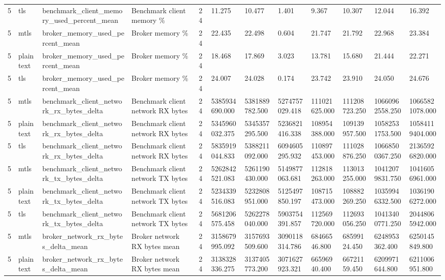 \begin{longtable}{llllllllllll}
5 & tls & benchmark\_client\_memory\_used\_percent\_mean & Benchmark client memory \% & 24 & 11.275 & 10.477 & 1.401 & 9.367 & 10.307 & 12.044 & 16.392 \\
5 & mtls & broker\_memory\_used\_percent\_mean & Broker memory \% & 24 & 22.435 & 22.498 & 0.604 & 21.747 & 21.792 & 22.968 & 23.384 \\
5 & plaintext & broker\_memory\_used\_percent\_mean & Broker memory \% & 24 & 18.468 & 17.869 & 3.023 & 13.781 & 15.680 & 21.444 & 22.271 \\
5 & tls & broker\_memory\_used\_percent\_mean & Broker memory \% & 24 & 24.007 & 24.028 & 0.174 & 23.742 & 23.910 & 24.050 & 24.676 \\
5 & mtls & benchmark\_client\_network\_rx\_bytes\_delta & Benchmark client network RX bytes & 24 & 5385934690.000 & 5381889782.500 & 5274757029.418 & 111021625.000 & 111208723.250 & 10660962558.250 & 10665821078.000 \\
5 & plaintext & benchmark\_client\_network\_rx\_bytes\_delta & Benchmark client network RX bytes & 24 & 5345960032.375 & 5345357295.500 & 5236821416.338 & 108954388.000 & 109139957.500 & 10582531753.500 & 10584119404.000 \\
5 & tls & benchmark\_client\_network\_rx\_bytes\_delta & Benchmark client network RX bytes & 24 & 5835919044.833 & 5388211092.000 & 6094605295.932 & 110897453.000 & 111028876.250 & 10668500367.250 & 21365926820.000 \\
5 & mtls & benchmark\_client\_network\_tx\_bytes\_delta & Benchmark client network TX bytes & 24 & 5262842521.083 & 5261190430.000 & 5149877063.681 & 112818263.000 & 113013255.000 & 10412079831.750 & 10416056961.000 \\
5 & plaintext & benchmark\_client\_network\_tx\_bytes\_delta & Benchmark client network TX bytes & 24 & 5234339516.083 & 5232808951.000 & 5125497850.197 & 108715473.000 & 108882269.250 & 10359946332.500 & 10361906272.000 \\
5 & tls & benchmark\_client\_network\_tx\_bytes\_delta & Benchmark client network TX bytes & 24 & 5681206575.458 & 5262278040.000 & 5903754391.857 & 112569720.000 & 112693056.250 & 10413400771.250 & 20448065942.000 \\
5 & mtls & broker\_network\_rx\_bytes\_delta\_mean & Broker network RX bytes mean & 24 & 3158679995.092 & 3157693509.600 & 3090118314.786 & 68466546.800 & 68599124.450 & 6248953362.400 & 6250145849.800 \\
5 & plaintext & broker\_network\_rx\_bytes\_delta\_mean & Broker network RX bytes mean & 24 & 3138328336.275 & 3137405773.200 & 3071627923.321 & 66596940.400 & 66721159.450 & 6209971644.800 & 6211006951.800 \\

\end{longtable}
